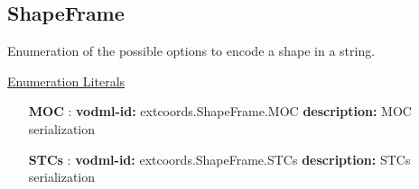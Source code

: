   \subsection{ShapeFrame}
  \label{sect:extcoords.ShapeFrame}

  Enumeration of the possible options to encode a shape in a string.

  \noindent \underline{Enumeration Literals}
  \vspace{-\parsep}
  \small
  \begin{itemize}
  
    \item[\textbf{MOC}]: \textbf{vodml-id:} extcoords.ShapeFrame.MOC \newline
          \textbf{description:} MOC serialization
    \item[\textbf{STCs}]: \textbf{vodml-id:} extcoords.ShapeFrame.STCs \newline
          \textbf{description:} STCs serialization
  \end{itemize}
  \normalsize
